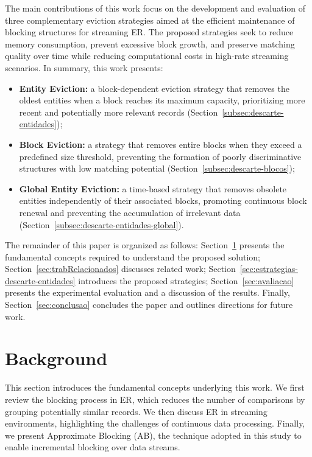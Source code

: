 \documentclass{ieeeaccess}
\begin{document}
The main contributions of this work focus on the development and evaluation of three complementary eviction strategies aimed at the efficient maintenance of blocking structures for streaming ER. The proposed strategies seek to reduce memory consumption, prevent excessive block growth, and preserve matching quality over time while reducing computational costs in high-rate streaming scenarios. In summary, this work presents:
 
\begin{itemize}\small
    \item \textbf{Entity Eviction:} a block-dependent eviction strategy that removes the oldest entities when a block reaches its maximum capacity, prioritizing more recent and potentially more relevant records (Section~\ref{subsec:descarte-entidades});
    
    \item \textbf{Block Eviction:} a strategy that removes entire blocks when they exceed a predefined size threshold, preventing the formation of poorly discriminative structures with low matching potential (Section~\ref{subsec:descarte-blocos});
    
    \item \textbf{Global Entity Eviction:} a time-based strategy that removes obsolete entities independently of their associated blocks, promoting continuous block renewal and preventing the accumulation of irrelevant data (Section~\ref{subsec:descarte-entidades-global}).
    
\end{itemize}

The remainder of this paper is organized as follows: Section~\ref{sec:background} presents the fundamental concepts required to understand the proposed solution; Section~\ref{sec:trabRelacionados} discusses related work; Section~\ref{sec:estrategias-descarte-entidades} introduces the proposed strategies; Section~\ref{sec:avaliacao} presents the experimental evaluation and a discussion of the results. Finally, Section~\ref{sec:conclusao} concludes the paper and outlines directions for future work.

\section{Background} \label{sec:background}

This section introduces the fundamental concepts underlying this work. We first review the blocking process in ER, which reduces the number of comparisons by grouping potentially similar records. We then discuss ER in streaming environments, highlighting the challenges of continuous data processing. Finally, we present Approximate Blocking (AB), the technique adopted in this study to enable incremental blocking over data streams.
\end{document}

